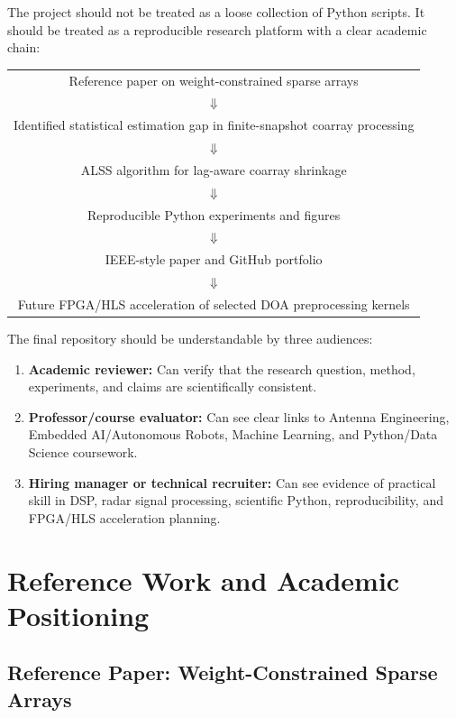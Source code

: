 \documentclass[11pt,letterpaper]{article}
\newcommand{\ALSS}{\textsc{ALSS}}
\begin{document}
The project should not be treated as a loose collection of Python scripts. It should be treated as a reproducible research platform with a clear academic chain:

\begin{center}
\begin{tabular}{c}
Reference paper on weight-constrained sparse arrays \\
$\Downarrow$ \\
Identified statistical estimation gap in finite-snapshot coarray processing \\
$\Downarrow$ \\
\ALSS{} algorithm for lag-aware coarray shrinkage \\
$\Downarrow$ \\
Reproducible Python experiments and figures \\
$\Downarrow$ \\
IEEE-style paper and GitHub portfolio \\
$\Downarrow$ \\
Future FPGA/HLS acceleration of selected DOA preprocessing kernels
\end{tabular}
\end{center}

The final repository should be understandable by three audiences:
\begin{enumerate}[leftmargin=*]
    \item \textbf{Academic reviewer:} Can verify that the research question, method, experiments, and claims are scientifically consistent.
    \item \textbf{Professor/course evaluator:} Can see clear links to Antenna Engineering, Embedded AI/Autonomous Robots, Machine Learning, and Python/Data Science coursework.
    \item \textbf{Hiring manager or technical recruiter:} Can see evidence of practical skill in DSP, radar signal processing, scientific Python, reproducibility, and FPGA/HLS acceleration planning.
\end{enumerate}

\section{Reference Work and Academic Positioning}

\subsection{Reference Paper: Weight-Constrained Sparse Arrays}
\end{document}
